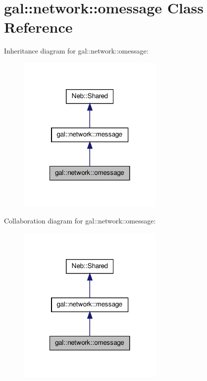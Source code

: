 \hypertarget{classgal_1_1network_1_1omessage}{\section{gal\-:\-:network\-:\-:omessage \-Class \-Reference}
\label{classgal_1_1network_1_1omessage}
}


\-Inheritance diagram for gal\-:\-:network\-:\-:omessage\-:
\nopagebreak
\begin{figure}[H]
\begin{center}
\leavevmode
\includegraphics[width=200pt]{classgal_1_1network_1_1omessage__inherit__graph}
\end{center}
\end{figure}


\-Collaboration diagram for gal\-:\-:network\-:\-:omessage\-:
\nopagebreak
\begin{figure}[H]
\begin{center}
\leavevmode
\includegraphics[width=200pt]{classgal_1_1network_1_1omessage__coll__graph}
\end{center}
\end{figure}
